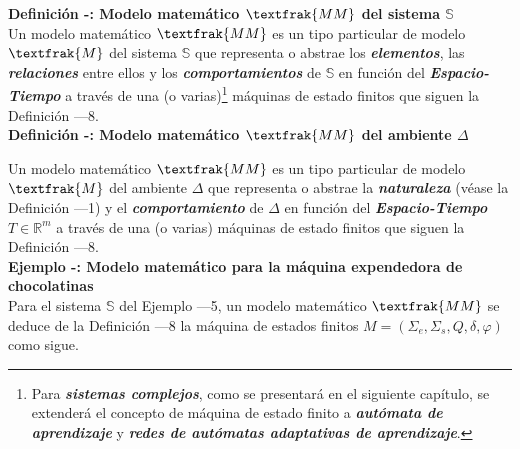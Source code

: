 \textbf{Definición -: Modelo matemático $\textfrak{MM}$ del sistema $\mathbb{S}$}\\

Un modelo matemático $\textfrak{MM}$ es un tipo particular de modelo $\textfrak{M}$ del sistema $\mathbb{S}$ que representa o abstrae los \textit{\textbf{elementos}}, las \textbf{\textit{relaciones}} entre ellos y los \textit{\textbf{comportamientos}} de $\mathbb{S}$ en función del \textbf{\textit{Espacio-Tiempo}} a través de una (o varias)\footnote[\arabic{footN}]{Para \textit{\textbf{sistemas complejos}}, como se presentará en el siguiente capítulo, se extenderá el concepto de máquina de estado finito a \textit{\textbf{autómata de aprendizaje}} y \textit{\textbf{redes de autómatas adaptativas de aprendizaje}}.} máquinas de estado finitos que siguen la Definición —8.\\

\textbf{Definición -: Modelo matemático $\textfrak{MM}$ del ambiente $\Delta$}\\


Un modelo matemático $\textfrak{MM}$ es un tipo particular de modelo $\textfrak{M}$ del ambiente $\Delta$ que representa o abstrae la \textbf{\textit{naturaleza}} (véase la Definición —1) y el \textbf{\textit{comportamiento}} de $\Delta$ en función del \textbf{\textit{Espacio-Tiempo}} $\textit{T} \in \mathbb{R}^m$ a través de una (o varias) máquinas de estado finitos que siguen la Definición —8.\\

\textbf{Ejemplo -: Modelo matemático para la máquina expendedora de chocolatinas}\\
Para el sistema $\mathbb{S}$ del Ejemplo —5, un modelo matemático $\textfrak{MM}$ se deduce de la Definición —8 la máquina de estados finitos $\textit{M}=(\Sigma_e,\Sigma_s,Q,\delta,\varphi)$ como sigue.\\


